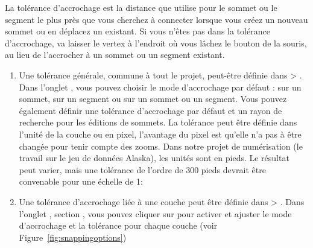 La tolérance d'accrochage est la distance que \qg utilise pour  le sommet ou le segment le plus près que vous cherchez à connecter lorsque vous créez un nouveau sommet ou en déplacez un existant. Si vous n'êtes pas dans la tolérance d'accrochage, \qg va laisser le vertex à l'endroit où vous lâchez le bouton de la souris, au lieu de l'accrocher à un sommet ou un segment existant.

\begin{enumerate}
\item Une tolérance générale, commune à tout le projet, peut-être définie dans  > . Dans l'onglet , vous pouvez choisir le mode d'accrochage par défaut : sur un sommet, sur un segment ou sur un sommet ou un segment. Vous pouvez également définir une tolérance d'accrochage par défaut et un rayon de recherche pour les éditions de sommets. La tolérance peut être définie dans l'unité de la couche ou en pixel, l'avantage du pixel est qu'elle n'a pas à être changée pour tenir compte des zooms. Dans notre projet de numérisation (le travail sur le jeu de données Alaska), les unités sont en pieds. Le résultat peut varier, mais une tolérance de l'ordre de 300 pieds devrait être convenable pour une échelle de 1:\ieme
\item Une tolérance d'accrochage liée à une couche peut être définie dans  > . Dans l'onglet , section , vous pouvez cliquer sur  pour activer et ajuster le mode d'accrochage et la tolérance pour chaque couche  (voir Figure~\ref{fig:snappingoptions})
\end{enumerate}

